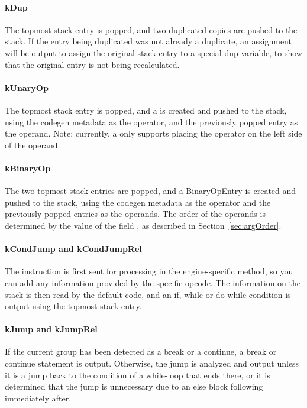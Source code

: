 \paragraph{kDup}
The topmost stack entry is popped, and two duplicated copies are pushed to the stack. If the entry being duplicated was not already a duplicate, an assignment will be output to assign the original stack entry to a special dup variable, to show that the original entry is not being recalculated.

\paragraph{kUnaryOp}
The topmost stack entry is popped, and a  is created and pushed to the stack, using the codegen metadata as the operator, and the previously popped entry as the operand. Note: currently, a  only supports placing the operator on the left side of the operand.

\paragraph{kBinaryOp}
The two topmost stack entries are popped, and a BinaryOpEntry is created and pushed to the stack, using the codegen metadata as the operator and the previously popped entries as the operands. The order of the operands is determined by the value of the field , as described in Section~\vref{sec:argOrder}.

\paragraph{kCondJump and kCondJumpRel}
The instruction is first sent for processing in the engine-specific  method, so you can add any information provided by the specific opcode. The information on the stack is then read by the default code, and an if, while or do-while condition is output using the topmost stack entry.

\paragraph{kJump and kJumpRel}
If the current group has been detected as a break or a continue, a break or continue statement is output. Otherwise, the jump is analyzed and output unless it is a jump back to the condition of a while-loop that ends there, or it is determined that the jump is unnecessary due to an else block following immediately after.

